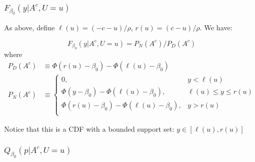 \begin{frame}
  \frametitle{$F_{\beta_0}(y|A^c,U=u)$}

  \footnotesize
    As above, define $\ell(u) = (-c -u)/\rho$, $r(u) = (c - u)/\rho$. We have:

    \[F_{\beta_0}(y|A^c,U=u) = P_N(A^c) / P_D(A^c) \]
where
\begin{align*}
  P_D(A^c) &\equiv \Phi\left(r(u) - \beta_0 \right) - \Phi\left( \ell(u) - \beta_0\right) \\
 P_N(A^c) &\equiv 
  \left\{
 \begin{array}{rr}
   0 ,& y < \ell(u)\\
   \Phi(y - \beta_0) - \Phi\left( \ell(u) - \beta_0 \right) ,& \ell(u) \leq y \leq r(u)\\
   \Phi\left(r(u) - \beta_0 \right) - \Phi\left( \ell(u) - \beta_0\right) 
 ,& y > r(u) \\
 \end{array}
 \right.
\end{align*}

\vspace{1em}
\alert{Notice that this is a CDF with a bounded support set: $y\in \left[ \ell(u), r(u) \right]$}
\end{frame}
\begin{frame}
  \frametitle{$Q_{\beta_0}(p|A^c,U=u)$}

  \footnotesize
\end{frame}

